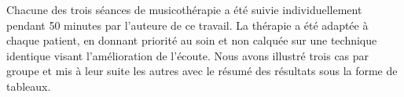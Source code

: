 Chacune des trois  séances de musicothérapie a été suivie individuellement  pendant 50 minutes par 
 l'auteure de ce 
 travail.
   La thérapie a été 
   adaptée à chaque patient, en donnant priorité au soin et non calquée sur une 
   technique identique visant l'amélioration de l'écoute. 
  Nous avons illustré trois cas par groupe  et mis à leur suite les autres avec le résumé des 
 résultats 
 sous la forme de tableaux.
 
 
 
 








